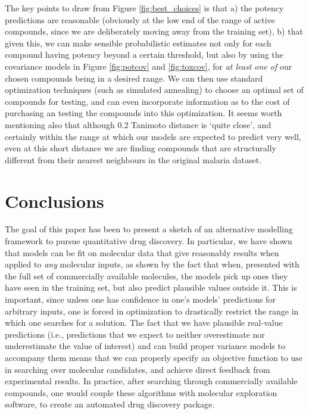 \documentclass{article}
\begin{document}
The key points to draw from Figure \ref{fig:best_choices} is that a) the potency predictions are reasonable (obviously at the low end of the range of active compounds, since we are deliberately moving away from the training set), b) that given this, we can make sensible probabilistic estimates not only for each compound having potency beyond a certain threshold, but also by using the covariance models in Figure \ref{fig:potcov} and \ref{fig:toxcov}, for \textit{at least one of} our chosen compounds being in a desired range.   We can then use standard optimization techniques (such as simulated annealing) to choose an optimal set of compounds for testing, and can even incorporate information as to the cost of purchasing an testing the compounds into this optimization.  It seems worth mentioning also that although $0.2$ Tanimoto distance is `quite close', and certainly within the range at which our models are expected to predict very well, even at this short distance we are finding compounds that are structurally different from their nearest neighbours in the original malaria dataset.  


\section{Conclusions}
The goal of this paper
has been to present a sketch of an alternative modelling framework to pursue quantitative drug discovery.
In particular, we have shown that models can be fit on molecular data that give reasonably results when applied to \textit{any} molecular inputs, as shown by the fact that when, presented with the full set of commercially available molecules, the models pick up ones they have seen in the training set, but also predict plausible values outside it.  This is important, since unless one has confidence in one's models' predictions for arbitrary inputs, one is forced in optimization to drastically restrict the range in which one searches for a solution.   The fact that we have plausible real-value predictions (i.e., predictions that we expect to neither overestimate nor underestimate the value of interest) and can build proper variance models to accompany them means that we can properly specify an objective function to use in searching over molecular candidates, and achieve direct feedback from experimental results.  In practice, after searching through commercially available compounds, one would couple these algorithms with molecular exploration software\cite{Firth2015,Merk2018}, 
to create an automated drug discovery package.
\end{document}
